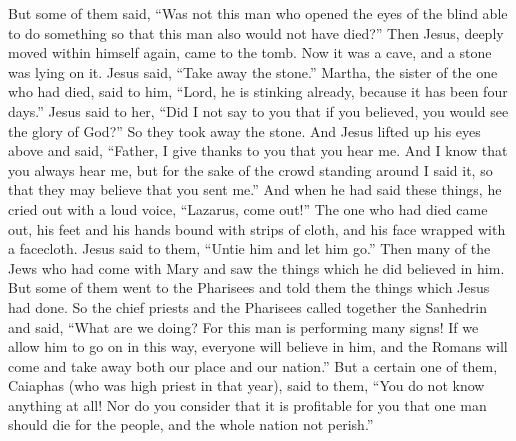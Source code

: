 \begin{biblechapter}
\verse But some of them said, “Was not this man who opened the eyes of the blind able to do something so that this man also would not have died?”
 Then Jesus, deeply moved within himself again, came to the tomb. Now it was a cave, and a stone was lying on it.
\verse Jesus said, “Take away the stone.” Martha, the sister of the one who had died, said to him, “Lord, he is stinking already, because it has been four days.”
\verse Jesus said to her, “Did I not say to you that if you believed, you would see the glory of God?”
\verse So they took away the stone. And Jesus lifted up his eyes above and said, “Father, I give thanks to you that you hear me.
\verse And I know that you always hear me, but for the sake of the crowd standing around I said it, so that they may believe that you sent me.”
\verse And when he had said these things, he cried out with a loud voice, “Lazarus, come out!”
\verse The one who had died came out, his feet and his hands bound with strips of cloth, and his face wrapped with a facecloth. Jesus said to them, “Untie him and let him go.”
 Then many of the Jews who had come with Mary and saw the things which he did believed in him.
\verse But some of them went to the Pharisees and told them the things which Jesus had done.
\verse So the chief priests and the Pharisees called together the Sanhedrin and said, “What are we doing? For this man is performing many signs!
\verse If we allow him to go on in this way, everyone will believe in him, and the Romans will come and take away both our place and our nation.”
\verse But a certain one of them, Caiaphas (who was high priest in that year), said to them, “You do not know anything at all!
\verse Nor do you consider that it is profitable for you that one man should die for the people, and the whole nation not perish.”

\end{biblechapter}
